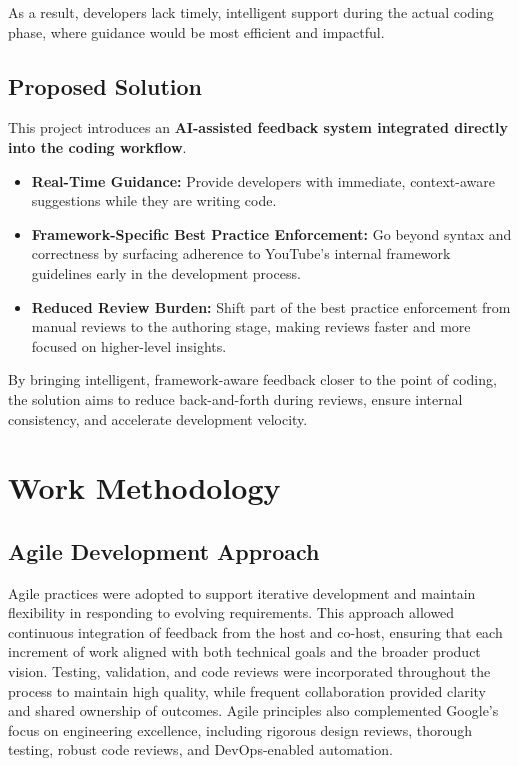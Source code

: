 \begin{spacing}{1.2}
As a result, developers lack timely, intelligent support during the actual coding phase, where guidance would be most efficient and impactful.  

\subsection{Proposed Solution}
This project introduces an \textbf{AI-assisted feedback system integrated directly into the coding workflow}.  
\begin{itemize}
    \item \textbf{Real-Time Guidance:} Provide developers with immediate, context-aware suggestions while they are writing code.  
    \item \textbf{Framework-Specific Best Practice Enforcement:} Go beyond syntax and correctness by surfacing adherence to YouTube’s internal framework guidelines early in the development process.  
    \item \textbf{Reduced Review Burden:} Shift part of the best practice enforcement from manual reviews to the authoring stage, making reviews faster and more focused on higher-level insights.  
\end{itemize}

By bringing intelligent, framework-aware feedback closer to the point of coding, the solution aims to reduce back-and-forth during reviews, ensure internal consistency, and accelerate development velocity.

\section{Work Methodology}

\subsection{Agile Development Approach}
Agile practices were adopted to support iterative development and maintain flexibility in responding to evolving requirements. This approach allowed continuous integration of feedback from the host and co-host, ensuring that each increment of work aligned with both technical goals and the broader product vision. Testing, validation, and code reviews were incorporated throughout the process to maintain high quality, while frequent collaboration provided clarity and shared ownership of outcomes. Agile principles also complemented Google’s focus on engineering excellence, including rigorous design reviews, thorough testing, robust code reviews, and DevOps-enabled automation.


\end{spacing}
